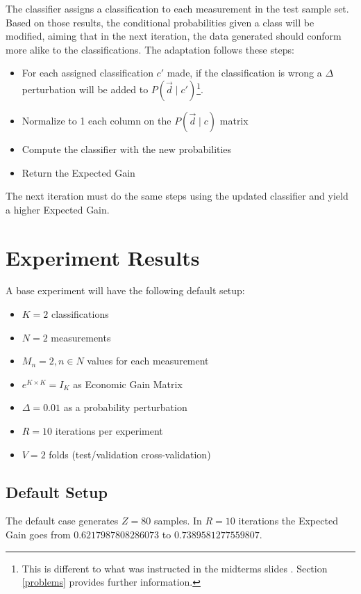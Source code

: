 \documentclass[letterpaper, conference]{IEEEtran}
\begin{document}
The classifier assigns a classification to each measurement in the test sample set. Based on those results, the conditional probabilities given a class will be modified, aiming that in the next iteration, the data generated should conform more alike to the classifications. The adaptation follows these steps:

\begin{itemize}
  \item For each assigned classification $c'$ made, if the classification is wrong a $\Delta$ perturbation will be added to $P(\vec{d} \mid c')$\footnote{This is different to what was instructed in the midterms slides \cite{midterm-project}. Section \ref{problems} provides further information.}.
  \item Normalize to 1 each column on the $P(\vec{d} \mid c)$ matrix
  \item Compute the classifier with the new probabilities
  \item Return the Expected Gain
\end{itemize}

The next iteration must do the same steps using the updated classifier and yield a higher Expected Gain.

\section{Experiment Results}

A base experiment will have the following default setup:

\begin{itemize}
  \item $K = 2$ classifications
  \item $N = 2$ measurements
  \item $M_n = 2, n \in N$ values for each measurement
  \item $e^{K \times K} = I_K$ as Economic Gain Matrix
  \item $\Delta = 0.01$ as a probability perturbation
  \item $R = 10$ iterations per experiment
  \item $V = 2$ folds (test/validation cross-validation)
\end{itemize}

\subsection{Default Setup}

The default case generates $Z = 80$ samples. In $R = 10$ iterations the Expected Gain goes from $0.6217987808286073$ to $0.7389581277559807$.
\end{document}
